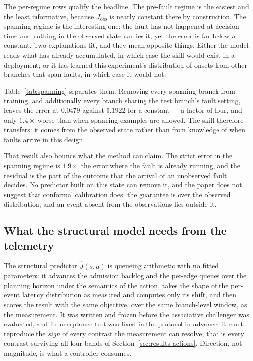 \documentclass[journal]{IEEEtran}
\begin{document}
The per-regime rows qualify the headline. The pre-fault regime is the easiest and
the least informative, because $J_{\mathrm{obs}}$ is nearly constant there by
construction. The spanning regime is the interesting one: the fault has not
happened at decision time and nothing in the observed state carries it, yet the
error is far below a constant. Two explanations fit, and they mean opposite
things. Either the model reads what has already accumulated, in which case the
skill would exist in a deployment; or it has learned this experiment's
distribution of onsets from other branches that span faults, in which case it
would not.



Table~\ref{tab:spanning} separates them. Removing every spanning branch from
training, and additionally every branch sharing the test branch's fault setting,
leaves the error at $0.0479$ against $0.1922$ for a constant --- a factor of
four, and only $1.4\times$ worse than when spanning examples are allowed. The
skill therefore transfers: it comes from the observed state rather than from
knowledge of when faults arrive in this design.

That result also bounds what the method can claim. The strict error in the
spanning regime is $1.9\times$ the error where the fault is already running, and
the residual is the part of the outcome that the arrival of an unobserved fault
decides. No predictor built on this state can remove it, and the paper does not
suggest that conformal calibration does: the guarantee is over the observed
distribution, and an event absent from the observations lies outside it.

\subsection{What the structural model needs from the telemetry}
\label{sec:results-identifiability}

The structural predictor $\hat{J}(s,a)$ is queueing arithmetic with no fitted
parameters: it advances the admission backlog and the per-edge queues over the
planning horizon under the semantics of the action, takes the shape of the
per-event latency distribution as measured and computes only its shift, and then
scores the result with the same objective, over the same branch-level window, as
the measurement. It was written and frozen before the associative challenger was
evaluated, and its acceptance test was fixed in the protocol in advance: it must
reproduce the \emph{sign} of every contrast the measurement can resolve, that is
every contrast surviving all four bands of Section~\ref{sec:results-actions}.
Direction, not magnitude, is what a controller consumes.
\end{document}
